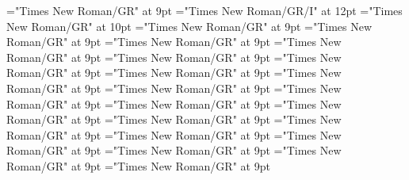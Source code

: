 \documentclass[gps1,twoside]{article}
\begin{document}
\font\locationpronunciationpronunciationssubentrysubentriesentryafter="Times New Roman/GR" at 9pt
\font\locationpronunciationpronunciationssubentrysubentriesentry="Times New Roman/GR/I" at 12pt
\font\spanwritingsystemprefixspanabbreviationlocationpronunciationpronunciationssubentrysubentriesentry="Times New Roman/GR" at 10pt
\font\spanwritingsystemprefixspanabbreviationlocationpronunciationpronunciationssubentrysubentriesentryafter="Times New Roman/GR" at 9pt
\font\spanspanabbreviationlocationpronunciationpronunciationssubentrysubentriesentrybefore="Times New Roman/GR" at 9pt
\font\spanabbreviationlocationpronunciationpronunciationssubentrysubentriesentrylastchildafter="Times New Roman/GR" at 9pt
\font\spanspannamelocationpronunciationpronunciationssubentrysubentriesentrybefore="Times New Roman/GR" at 9pt
\font\spannamelocationpronunciationpronunciationssubentrysubentriesentrylastchildafter="Times New Roman/GR" at 9pt
\font\spanspanaliaslocationpronunciationpronunciationssubentrysubentriesentrybefore="Times New Roman/GR" at 9pt
\font\spanaliaslocationpronunciationpronunciationssubentrysubentriesentrylastchildafter="Times New Roman/GR" at 9pt
\font\spanspanvariantformentrybackrefssubentrysubentriesentrybefore="Times New Roman/GR" at 9pt
\font\variantformentrybackrefssubentrysubentriesentrybefore="Times New Roman/GR" at 9pt
\font\variantformentrybackrefssubentrysubentriesentryafter="Times New Roman/GR" at 9pt
\font\variantentrytypevariantentrytypevariantentrytypesvariantformentrybackrefvariantformentrybackrefssubentrysubentriesentrybefore="Times New Roman/GR" at 9pt
\font\variantentrytypesvariantformentrybackrefvariantformentrybackrefssubentrysubentriesentryafter="Times New Roman/GR" at 9pt
\font\spanspanreverseabbrvariantentrytypevariantentrytypesvariantformentrybackrefvariantformentrybackrefssubentrysubentriesentrybefore="Times New Roman/GR" at 9pt
\font\spanreverseabbrvariantentrytypevariantentrytypesvariantformentrybackrefvariantformentrybackrefssubentrysubentriesentrylastchildafter="Times New Roman/GR" at 9pt
\font\spanspanheadwordvariantformentrybackrefvariantformentrybackrefssubentrysubentriesentrybefore="Times New Roman/GR" at 9pt
\font\spanspanowningentrysummarydefinitionvariantformentrybackrefvariantformentrybackrefssubentrysubentriesentrybefore="Times New Roman/GR" at 9pt
\font\spanowningentrysummarydefinitionvariantformentrybackrefvariantformentrybackrefssubentrysubentriesentrylastchildafter="Times New Roman/GR" at 9pt
\font\etymologysubentrysubentriesentrybefore="Times New Roman/GR" at 9pt
\font\etymologysubentrysubentriesentryafter="Times New Roman/GR" at 9pt
\end{document}
